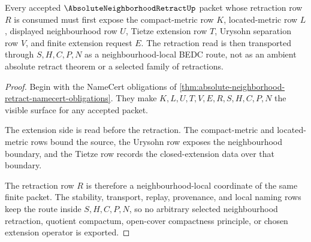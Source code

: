 \begin{theorem}\label{thm:absolute-neighborhood-retract-extension-retraction-route}
Every accepted $\AbsoluteNeighborhoodRetractUp$ packet whose retraction row $R$ is consumed must first expose the compact-metric row $K$, located-metric row $L$, displayed neighbourhood row $U$, Tietze extension row $T$, Urysohn separation row $V$, and finite extension request $E$. The retraction read is then transported through $S,H,C,P,N$ as a neighbourhood-local BEDC route, not as an ambient absolute retract theorem or a selected family of retractions.
\end{theorem}
\begin{proof}
Begin with the NameCert obligations of \autoref{thm:absolute-neighborhood-retract-namecert-obligations}. They make $K,L,U,T,V,E,R,S,H,C,P,N$ the visible surface for any accepted packet.

The extension side is read before the retraction. The compact-metric and located-metric rows bound the source, the Urysohn row exposes the neighbourhood boundary, and the Tietze row records the closed-extension data over that boundary.

The retraction row $R$ is therefore a neighbourhood-local coordinate of the same finite packet. The stability, transport, replay, provenance, and local naming rows keep the route inside $S,H,C,P,N$, so no arbitrary selected neighbourhood retraction, quotient compactum, open-cover compactness principle, or chosen extension operator is exported.
\end{proof}


\begin{closurestatus}{\AbsoluteNeighborhoodRetractUp}
  \theoryclosure{\seedClosure}
  \formalstatus{\unformalizedV}
\end{closurestatus}
